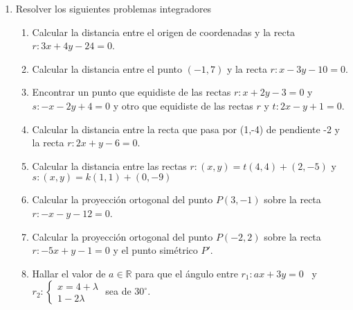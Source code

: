 \documentclass[a4paper]{article}
\newcommand{\exercise}{\item}
\begin{document}
\begin{enumerate}
\begin{multicols}{2}
\begin{enumerate} [label=(\alph*)]
		\item $\left\{\begin{matrix}-x+y-5=0 \\ 2x+y-17=0 \\ x+2y-17=0 \\ 3x+3y-34=0 \end{matrix}\right.$
	\end{enumerate}
	\end{multicols}
	\exercise Resolver los siguientes problemas integradores
	\begin{enumerate} [label=(\alph*)]
		\item Calcular la distancia entre el origen de coordenadas y la recta $r: 3x+4y -24=0$.
		\item Calcular la distancia entre el punto $(-1,7)$ y la recta $r: x-3y -10=0$.
		\item Encontrar un punto que equidiste de las rectas $r: x+2y-3=0$ y $s: -x-2y+4=0$ y otro que equidiste de las rectas $r$ y $t: 2x-y+1=0$.
		\item Calcular la distancia entre la recta que pasa por (1,-4) de pendiente -2 y la recta $r: 2x+y-6=0$.
		\item Calcular la distancia entre las rectas $r: (x,y)=t(4,4)+(2,-5)$ y $s: (x,y)=k(1,1)+(0,-9)$
		\item Calcular la proyección ortogonal del punto $P(3,-1)$ sobre la recta $r: -x-y-12=0$.
		\item Calcular la proyección ortogonal del punto $P(-2,2)$ sobre la recta $r: -5x+y-1=0$ y el punto simétrico $P'$.
		\item Hallar el valor de $a\in\mathbb{R}$ para que el ángulo entre $r_1: ax+3y=0$ ~y~ $r_2:\left\{\begin{matrix} x=4+\lambda \\ 1-2\lambda \end{matrix}\right.$ sea de $30^{\circ}$. 
	\end{enumerate}
\end{enumerate}
\vspace{20pt} 
\end{document}
